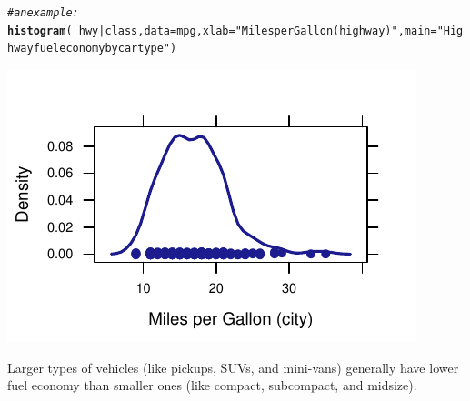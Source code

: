 \documentclass[twoside]{book}\usepackage[]{graphicx}\usepackage[]{xcolor}
\makeatletter
\def\maxwidth{ %
  \ifdim\Gin@nat@width>\linewidth
    \linewidth
  \else
    \Gin@nat@width
  \fi
}
\newcommand{\hlstr}[1]{\textcolor[rgb]{0.192,0.494,0.8}{#1}}%
\newcommand{\hlcom}[1]{\textcolor[rgb]{0.678,0.584,0.686}{\textit{#1}}}%
\newcommand{\hlopt}[1]{\textcolor[rgb]{0,0,0}{#1}}%
\newcommand{\hlstd}[1]{\textcolor[rgb]{0.345,0.345,0.345}{#1}}%
\newcommand{\hlkwc}[1]{\textcolor[rgb]{0.333,0.667,0.333}{#1}}%
\newcommand{\hlkwd}[1]{\textcolor[rgb]{0.737,0.353,0.396}{\textbf{#1}}}%
\newenvironment{kframe}{%
 \def\at@end@of@kframe{}%
 \ifinner\ifhmode%
  \def\at@end@of@kframe{\end{minipage}}%
  \begin{minipage}{\columnwidth}%
 \fi\fi%
 \def\FrameCommand##1{\hskip\@totalleftmargin \hskip-\fboxsep
 \colorbox{shadecolor}{##1}\hskip-\fboxsep
     \hskip-\linewidth \hskip-\@totalleftmargin \hskip\columnwidth}%
 \MakeFramed {\advance\hsize-\width
   \@totalleftmargin\z@ \linewidth\hsize
   \@setminipage}}%
 {\par\unskip\endMakeFramed%
 \at@end@of@kframe}
\newenvironment{knitrout}{}{} %
\newcounter{example}[section]
\makeatother
\begin{document}
\begin{solution}
\begin{knitrout}
\color{fgcolor}\begin{kframe}
\begin{alltt}
\hlcom{# an example:}
\hlkwd{histogram}\hlstd{(}\hlopt{~}\hlstd{hwy} \hlopt{|} \hlstd{class,} \hlkwc{data} \hlstd{= mpg,} \hlkwc{xlab} \hlstd{=} \hlstr{"Miles per Gallon (highway)"}\hlstd{,} \hlkwc{main} \hlstd{=} \hlstr{"Highway fuel economy by car type"}\hlstd{)}
\end{alltt}
\end{kframe}

{\centering \includegraphics[width=\maxwidth]{figures/fig-unnamed-chunk-25-1} 

}



\end{knitrout}
Larger types of vehicles (like pickups, SUVs, and mini-vans) generally have lower fuel economy than smaller ones (like compact, subcompact, and midsize).
\end{solution}
\end{document}
